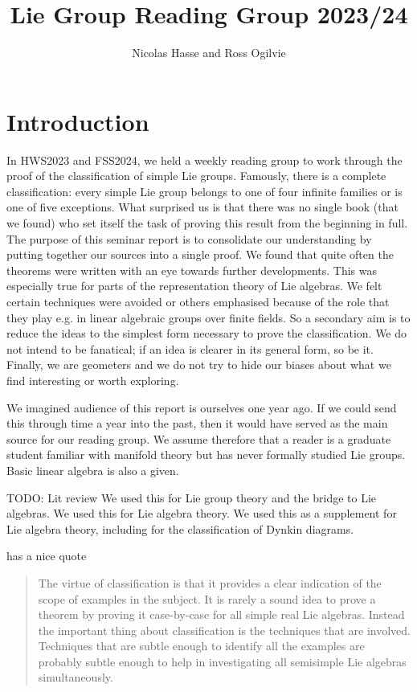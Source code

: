 \documentclass[twoside,11pt,a4paper,leqno]{article}
\numberwithin{equation}{section}
\theoremstyle{plain}
\theoremstyle{definition}
\begin{document}
\title{Lie Group Reading Group 2023/24}
\author{Nicolas Hasse and Ross Ogilvie}
\maketitle

\section{Introduction}

In HWS2023 and FSS2024, we held a weekly reading group to work through the proof of the classification of simple Lie groups.
Famously, there is a complete classification: every simple Lie group belongs to one of four infinite families or is one of five exceptions.
What surprised us is that there was no single book (that we found) who set itself the task of proving this result from the beginning in full.
The purpose of this seminar report is to consolidate our understanding by putting together our sources into a single proof.
We found that quite often the theorems were written with an eye towards further developments.
This was especially true for parts of the representation theory of Lie algebras.
We felt certain techniques were avoided or others emphasised because of the role that they play e.g. in linear algebraic groups over finite fields.
So a secondary aim is to reduce the ideas to the simplest form necessary to prove the classification.
We do not intend to be fanatical; if an idea is clearer in its general form, so be it.
Finally, we are geometers and we do not try to hide our biases about what we find interesting or worth exploring.

We imagined audience of this report is ourselves one year ago.
If we could send this through time a year into the past, then it would have served as the main source for our reading group. 
We assume therefore that a reader is a graduate student familiar with manifold theory but has never formally studied Lie groups.
Basic linear algebra is also a given.

TODO: Lit review
\cite{Warner1983} We used this for Lie group theory and the bridge to Lie algebras.
\cite{Hall2015} We used this for Lie algebra theory.
\cite{Fulton2004} We used this as a supplement for Lie algebra theory, including for the classification of Dynkin diagrams.

\cite[p.~349]{Knapp1986} has a nice quote 
\begin{quotation}
The virtue of classification is that it provides a clear indication of
the scope of examples in the subject. It is rarely a sound idea to prove
a theorem by proving it case-by-case for all simple real Lie algebras.
Instead the important thing about classification is the techniques that are
involved. Techniques that are subtle enough to identify all the examples
are probably subtle enough to help in investigating all semisimple Lie
algebras simultaneously.
\end{quotation}
\end{document}
